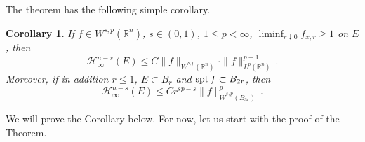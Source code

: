 \documentclass[11pt,reqno]{amsart}
\newcommand{\R}{\mathbb R}
\renewcommand{\H}{\mathcal{H}}
\newcommand{\spt}{{\rm spt}\,}
\newtheorem{corollary}[theorem]{Corollary}
\theoremstyle{definition}
\numberwithin{equation}{section}
\begin{document}
The theorem has the following simple corollary.

\begin{corollary}\label{c:capacity-estimate}
If $f\in W^{s,p}(\R^n)$, $s\in(0,1)$, $1\le p<\infty$, $\liminf_{r\downarrow0}f_{x,r}\ge 1$ on $E$, then
\begin{equation}\label{e:capacity-estimate-3}
\H^{n-s}_\infty(E)\le C\|f\|_{\dot{W}^{s,p}(\R^n)}\cdot\|f\|_{L^p(\R^n)}^{p-1}\, .
\end{equation}
Moreover, if in addition $r\leq 1$, $E\subset B_r$ and $\spt f\subset B_{2r}$, then
\begin{equation}\label{e:capacity-estimate-4}
\H^{n-s}_\infty(E)\le Cr^{sp-s}\|f\|_{\dot{W}^{s,p}(B_{3r})}^p\, .
\end{equation}
\end{corollary}
We will prove the Corollary below. For now, let us start with the proof of the Theorem.
\end{document}
